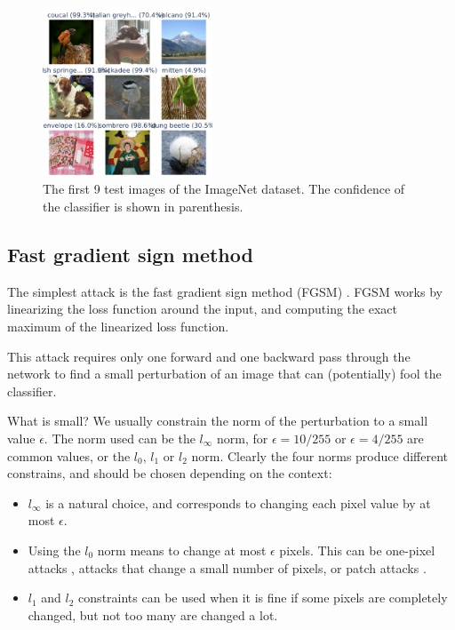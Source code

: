 \documentclass[]{scrarticle}
\begin{document}
\begin{figure}[h]
  \centering
  \includegraphics[width=0.45\textwidth]{../images/sample_ImageNet.png}
  \caption{The first 9 test images of the ImageNet dataset.
    The confidence of the classifier is shown in parenthesis.}
  \label{fig:imagenet_samples}
\end{figure}


\subsection{Fast gradient sign method}
The simplest attack is the fast gradient sign method (FGSM) \cite{goodfellow2014explaining}.
FGSM works by linearizing the loss function around the input, and
computing the exact maximum of the linearized loss function.

This attack requires only one forward and one backward pass through the network
to find a small perturbation of an image that can (potentially) fool the classifier.

What is small? We usually constrain the norm of the perturbation to
a small value $\epsilon$. The norm used can be the $l_\infty$ norm,
for $\epsilon = 10 / 255$ or $\epsilon = 4 / 255$ are common values,
or the $l_0$, $l_1$ or $l_2$ norm.
Clearly the four norms produce different constrains, and should be chosen
depending on the context:
\begin{itemize}
  \item $l_\infty$ is a natural choice, and corresponds to changing each
    pixel value by at most $\epsilon$.
  \item Using the $l_0$ norm means to change at most $\epsilon$ pixels. This
    can be one-pixel attacks \cite{Su2017OnePA},
    attacks that change a small number of pixels,
    or patch attacks \cite{Brown2017AdversarialP}.
  \item $l_1$ and $l_2$ constraints can be used when it is fine if
    some pixels are completely changed, but not too many are changed
    a lot.
\end{itemize}
\end{document}
